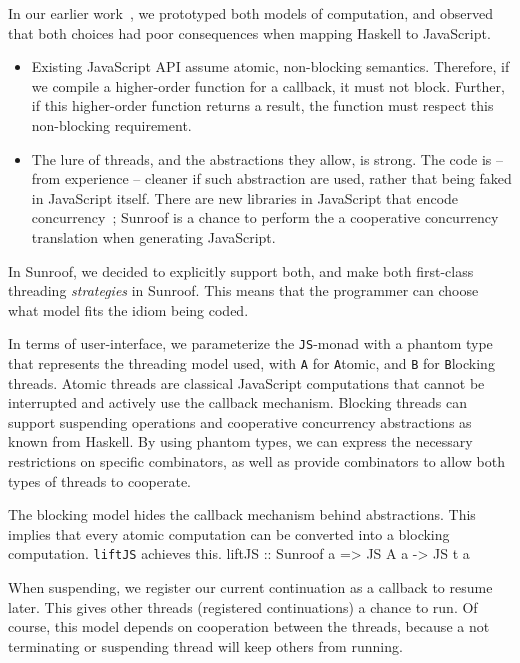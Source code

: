 \documentclass{llncs}
\newcommand{\Src}[1]{{\tt{#1}}}
\newcommand{\JS}{\Src{JS}}
\newenvironment{Code}{\verbatim}{\endverbatim}
\begin{document}
In our earlier work~\cite{...}, we prototyped both models
of computation, and observed that both choices had poor consequences
when mapping Haskell to JavaScript.
\begin{itemize}
\item Existing JavaScript API assume atomic, non-blocking
semantics. Therefore, if we compile a higher-order function
for a callback, it must not block. 
Further, if this higher-order function returns a result, 
the function must respect this non-blocking requirement.
\item The lure of threads, and the abstractions they allow, 
is strong. The code is -- from experience -- cleaner if such abstraction
are used, rather that being faked in JavaScript itself.
There are new libraries in JavaScript that encode
concurrency~\cite{...}; Sunroof is a chance to
perform the a cooperative concurrency translation
when generating JavaScript.
\end{itemize}
In Sunroof, we decided to explicitly support both,
and make both first-class threading {\em strategies\/} in Sunroof.
This means that the programmer can choose what model fits
the idiom being coded.

In terms of user-interface, we parameterize the \JS-monad
with a phantom type that represents the threading model used, 
with \Src{A} for \Src{A}tomic,
and \Src{B} for \Src{B}locking threads. 
Atomic threads are classical JavaScript computations that
cannot be interrupted and actively use the callback
mechanism. Blocking threads can
support suspending operations and cooperative concurrency
abstractions as known from Haskell. By using phantom
types, we can express the necessary
restrictions on specific combinators, as well
as provide combinators to allow both types of
threads to cooperate.

The blocking model hides the callback mechanism behind abstractions.
This implies that every atomic computation can be converted into 
a blocking computation. \Src{liftJS} achieves this.
\begin{Code}
liftJS :: Sunroof a => JS A a -> JS t a
\end{Code}

When suspending, we register our current
continuation as a callback to resume later. This gives other 
threads (registered continuations) a chance to run.
Of course, this model depends on cooperation between the threads,
because a not terminating or suspending thread will keep others from running.
\end{document}
